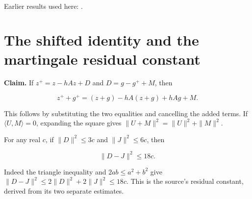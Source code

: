 \documentclass[11pt,a4paper]{article}
\begin{document}
Earlier results used here: \cite[Section~3.10.1]{LangevinLean2026ULASC}.

\section{\texorpdfstring{The shifted identity and the martingale residual constant}{The shifted identity and the martingale residual constant}}


\textbf{Claim.} If \(z^+=z-hAz+D\) and \(D=g-g^++M\), then

\[z^++g^+=(z+g)-hA(z+g)+hAg+M.\]


This follows by substituting the two equalities and cancelling the added terms. If \(\langle U,M\rangle=0\), expanding the square gives \(\|U+M\|^2=\|U\|^2+\|M\|^2\).




For any real \(c\), if \(\|D\|^2\le3c\) and \(\|J\|^2\le6c\), then

\[\|D-J\|^2\le18c.\]


Indeed the triangle inequality and \(2ab\le a^2+b^2\) give \(\|D-J\|^2\le2\|D\|^2+2\|J\|^2\le18c\). This is the source's residual constant, derived from its two separate estimates.
\end{document}
